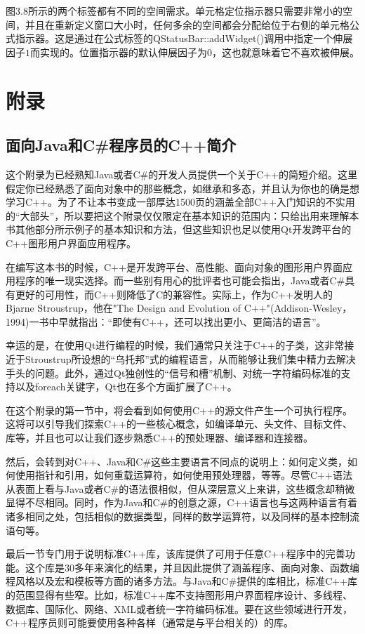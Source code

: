 \documentclass[11pt,oneside]{book}
\begin{document}
\begin{common-format}
图3.8所示的两个标签都有不同的空间需求。单元格定位指示器只需要非常小的空间，并且在重新定义窗口大小时，任何多余的空间都会分配给位于右侧的单元格公式指示器。这是通过在公式标签的QStatusBar::addWidget()调用中指定一个伸展因子$ 1 $而实现的。位置指示器的默认伸展因子为$ 0 $，这也就意味着它不喜欢被伸展。



\appendix

\part{附录}
\chapter{面向Java和C\#{}程序员的C++简介}
这个附录为已经熟知Java或者C\#{}的开发人员提供一个关于C++的简短介绍。这里假定你已经熟悉了面向对象中的那些概念，如继承和多态，并且认为你也的确是想学习C++。为了不让本书变成一部厚达1500页的涵盖全部C++入门知识的不实用的“大部头”，所以要把这个附录仅仅限定在基本知识的范围内：只给出用来理解本书其他部分所示例子的基本知识和方法，但这些知识也足以使用Qt开发跨平台的C++图形用户界面应用程序。

在编写这本书的时候，C++是开发跨平台、高性能、面向对象的图形用户界面应用程序的唯一现实选择。而一些别有用心的批评者也可能会指出，Java或者C\#{}具有更好的可用性，而C++则降低了C的兼容性。实际上，作为C++发明人的Bjarne Stroustrup，他在"The Design and Evolution of C++"(Addison-Wesley，1994)一书中早就指出：“即使有C++，还可以找出更小、更简洁的语言”。

幸运的是，在使用Qt进行编程的时候，我们通常只关注于C++的子类，这非常接近于Stroustrup所设想的“乌托邦”式的编程语言，从而能够让我们集中精力去解决手头的问题。此外，通过Qt独创性的“信号和槽”机制、对统一字符编码标准的支持以及foreach关键字，Qt也在多个方面扩展了C++。

在这个附录的第一节中，将会看到如何使用C++的源文件产生一个可执行程序。这将可以引导我们探索C++的一些核心概念，如编译单元、头文件、目标文件、库等，并且也可以让我们逐步熟悉C++的预处理器、编译器和连接器。

然后，会转到对C++、Java和C\#{}这些主要语言不同点的说明上：如何定义类，如何使用指针和引用，如何重载运算符，如何使用预处理器，等等。尽管C++语法从表面上看与Java或者C\#{}的语法很相似，但从深层意义上来讲，这些概念却稍微显得不尽相同。同时，作为Java和C\#{}的创意之源，C++语言也与这两种语言有着诸多相同之处，包括相似的数据类型，同样的数学运算符，以及同样的基本控制流语句等。

最后一节专门用于说明标准C++库，该库提供了可用于任意C++程序中的完善功能。这个库是30多年来演化的结果，并且因此提供了涵盖程序、面向对象、函数编程风格以及宏和模板等方面的诸多方法。与Java和C\#{}提供的库相比，标准C++库的范围显得有些窄。比如，标准C++库不支持图形用户界面程序设计、多线程、数据库、国际化、网络、XML或者统一字符编码标准。要在这些领域进行开发，C++程序员则可能要使用各种各样（通常是与平台相关的）的库。


\end{common-format}
\end{document}
